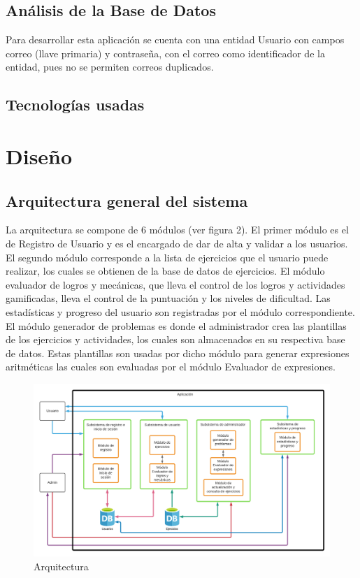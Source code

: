 \documentclass{article}
\begin{document}
\subsection{Análisis de la Base de Datos}%
Para desarrollar esta aplicación se cuenta con una entidad Usuario con campos correo (llave primaria) y contraseña, con el correo como identificador de la entidad, pues no se permiten correos duplicados.
\subsection{Tecnologías usadas}
\pagebreak
\section{Diseño}
\subsection{Arquitectura general del sistema}%
La arquitectura se compone de 6 módulos (ver figura 2).  El primer módulo es el de Registro de Usuario y es el encargado de dar de alta y validar a los usuarios. El segundo módulo corresponde a la lista de ejercicios que el usuario puede realizar, los cuales se obtienen de la base de datos de ejercicios. El módulo evaluador de logros y mecánicas, que lleva el control de los logros y actividades gamificadas, lleva el control de la puntuación y los niveles de dificultad. Las estadísticas y progreso del usuario son registradas por el módulo correspondiente. El módulo generador de problemas es donde el administrador crea las plantillas de los ejercicios y actividades, los cuales son almacenados en su respectiva base de datos. Estas plantillas son usadas por dicho módulo para generar expresiones aritméticas las cuales son evaluadas por el módulo Evaluador de expresiones.  
\begin{figure}[H]
    \centering
    \includegraphics[scale=0.7]{imgs/Arquitectura}
    \caption{Arquitectura}
\end{figure}
\end{document}
